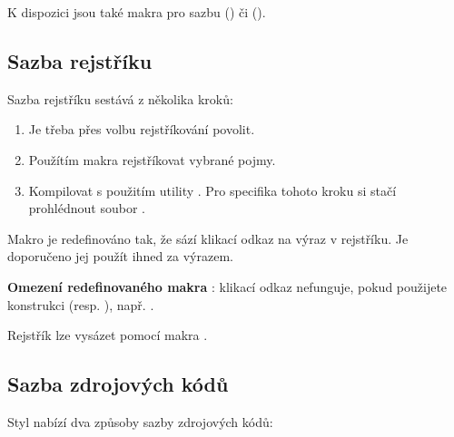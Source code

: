 \documentclass[
  biblatex,
  figures=false,
  glossaries,
  index
]{kidiplom}
\begin{document}
K dispozici jsou také makra pro sazbu \csharp{} () či \cpp{} ().


\subsection{Sazba rejstříku}
Sazba rejstříku sestává z několika kroků:

\begin{enumerate}
\item Je třeba přes volbu  rejstříkování povolit.
\item Použítím makra  rejstříkovat vybrané pojmy.
\item Kompilovat s použitím utility . Pro specifika tohoto kroku si stačí prohlédnout soubor .
\end{enumerate}

Makro  je redefinováno tak, že sází klikací odkaz na výraz v rejstříku. Je doporučeno jej použít ihned za výrazem.

\textbf{Omezení redefinovaného makra }: klikací odkaz nefunguje, pokud použijete konstrukci  (resp. ), např. .

Rejstřík lze vysázet pomocí makra .

\subsection{Sazba zdrojových kódů}
Styl nabízí dva způsoby sazby zdrojových kódů:
\end{document}

